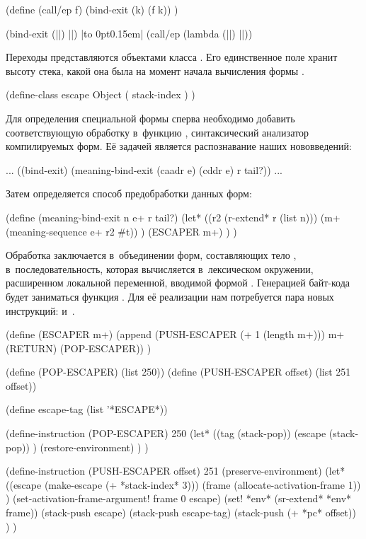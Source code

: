 {\def\E{\hbox to 0pt{\kern0.15em\eq}}
\def\K{\ii{k}}
\def\B{\ii{тело}}
\begin{code:lisp}
(define (call/ep f)
  (bind-exit (k) (f k)) )

(bind-exit (|\K|) |\B|) |\E|   (call/ep (lambda (|\K|) |\B|))
\end{code:lisp}}

Переходы представляются объектами класса . Его единственное поле
хранит высоту стека, какой она была на момент начала вычисления формы
.

\begin{code:lisp}
(define-class escape Object
  ( stack-index ) )
\end{code:lisp}

Для определения специальной формы сперва необходимо добавить соответствующую
обработку в~функцию , синтаксический анализатор компилируемых форм.
Её задачей является распознавание наших нововведений:

\begin{code:lisp}
... ((bind-exit) (meaning-bind-exit (caadr e) (cddr e) r tail?)) ...
\end{code:lisp}

Затем определяется способ предобработки данных форм:

\begin{code:lisp}
(define (meaning-bind-exit n e+ r tail?)
  (let* ((r2 (r-extend* r (list n)))
         (m+ (meaning-sequence e+ r2 #t)) )
    (ESCAPER m+) ) )
\end{code:lisp}

Обработка заключается в~объединении форм, составляющих тело ,
в~последовательность, которая вычисляется в~лексическом окружении, расширенном
локальной переменной, вводимой формой . Генерацией байт-кода
будет заниматься функция . Для её реализации нам потребуется пара
новых инструкций:  и~.

\begin{code:lisp}
(define (ESCAPER m+)
  (append (PUSH-ESCAPER (+ 1 (length m+)))
          m+ (RETURN) (POP-ESCAPER)) )

(define (POP-ESCAPER) (list 250))
(define (PUSH-ESCAPER offset) (list 251 offset))

(define escape-tag (list '*ESCAPE*))

(define-instruction (POP-ESCAPER) 250
  (let* ((tag (stack-pop))
         (escape (stack-pop)) )
    (restore-environment) ) )

(define-instruction (PUSH-ESCAPER offset) 251
  (preserve-environment)
  (let* ((escape (make-escape (+ *stack-index* 3)))
         (frame (allocate-activation-frame 1)) )
    (set-activation-frame-argument! frame 0 escape)
    (set! *env* (sr-extend* *env* frame))
    (stack-push escape)
    (stack-push escape-tag)
    (stack-push (+ *pc* offset)) ) )
\end{code:lisp}

